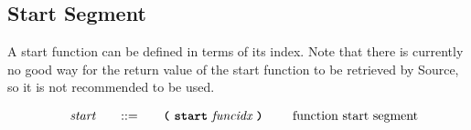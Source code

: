 \subsection{Start Segment}

A start function can be defined in terms of its index. 
Note that there is currently no good way for the return value of the start function to be retrieved by Source, so it is not recommended to be used.

\begin{alignat*}{9}
    && \textit{start}    &&\quad ::= &\quad && \textbf{\texttt{(}}\ \textbf{\texttt{start}}\ \textit{funcidx}\ \textbf{\texttt{)}}\ \quad && \textrm{function start segment} \\[1mm]
\end{alignat*}
